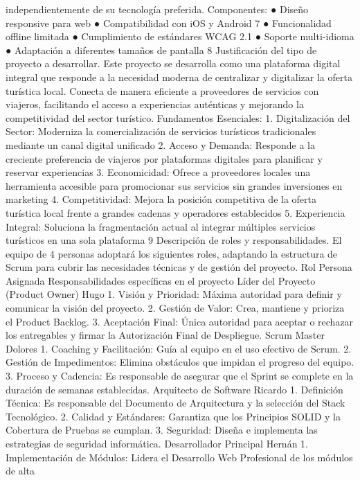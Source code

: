 independientemente de su tecnología preferida.
Componentes:
● Diseño responsive para web
● Compatibilidad con iOS y Android
7
● Funcionalidad offline limitada
● Cumplimiento de estándares WCAG 2.1
● Soporte multi-idioma
● Adaptación a diferentes tamaños de pantalla
8
Justificación del tipo de proyecto a desarrollar.
Este proyecto se desarrolla como una plataforma digital integral que responde a la
necesidad moderna de centralizar y digitalizar la oferta turística local. Conecta de
manera eficiente a proveedores de servicios con viajeros, facilitando el acceso a
experiencias auténticas y mejorando la competitividad del sector turístico.
Fundamentos Esenciales:
1. Digitalización del Sector: Moderniza la comercialización de servicios
turísticos tradicionales mediante un canal digital unificado
2. Acceso y Demanda: Responde a la creciente preferencia de viajeros por
plataformas digitales para planificar y reservar experiencias
3. Economicidad: Ofrece a proveedores locales una herramienta accesible
para promocionar sus servicios sin grandes inversiones en marketing
4. Competitividad: Mejora la posición competitiva de la oferta turística local
frente a grandes cadenas y operadores establecidos
5. Experiencia Integral: Soluciona la fragmentación actual al integrar múltiples
servicios turísticos en una sola plataforma
9
Descripción de roles y responsabilidades.
El equipo de 4 personas adoptará los siguientes roles, adaptando la estructura de
Scrum para cubrir las necesidades técnicas y de gestión del proyecto.
Rol Persona
Asignada
Responsabilidades específicas en el proyecto
Líder del
Proyecto
(Product
Owner)
Hugo 1. Visión y Prioridad: Máxima autoridad para definir
y comunicar la visión del proyecto.
2. Gestión de Valor: Crea, mantiene y prioriza el
Product Backlog.
3. Aceptación Final: Única autoridad para aceptar o
rechazar los entregables y firmar la Autorización
Final de Despliegue.
Scrum Master Dolores 1. Coaching y Facilitación: Guía al equipo en el uso
efectivo de Scrum.
2. Gestión de Impedimentos: Elimina obstáculos que
impidan el progreso del equipo.
3. Proceso y Cadencia: Es responsable de asegurar
que el Sprint se complete en la duración de
semanas establecidas.
Arquitecto de
Software
Ricardo 1. Definición Técnica: Es responsable del
Documento de Arquitectura y la selección del Stack
Tecnológico.
2. Calidad y Estándares: Garantiza que los
Principios SOLID y la Cobertura de Pruebas se
cumplan.
3. Seguridad: Diseña e implementa las estrategias
de seguridad informática.
Desarrollador
Principal
Hernán 1. Implementación de Módulos: Lidera el Desarrollo
Web Profesional de los módulos de alta
